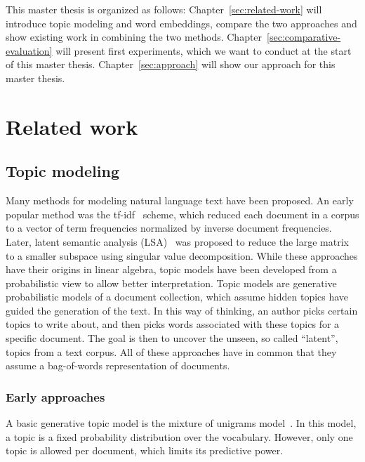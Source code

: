 \documentclass[
        a4paper,
        titlepage,
        twoside,
        parskip
        ]{scrbook}
\theoremstyle{break}
\begin{document}
This master thesis is organized as follows: Chapter~\ref{sec:related-work} will introduce topic modeling and word embeddings, compare the two approaches and show existing work in combining the two methods.
Chapter~\ref{sec:comparative-evaluation} will present first experiments, which we want to conduct at the start of this master thesis.
Chapter~\ref{sec:approach} will show our approach for this master thesis.

\chapter{Related work}
\label{chapter:related-work}
\section{Topic modeling}

Many methods for modeling natural language text have been proposed.
An early popular method was the tf-idf~\cite{SparckJones1972} scheme, which reduced each document in a corpus to a vector of term frequencies normalized by inverse document frequencies.
Later, latent semantic analysis (LSA)~\cite{Deerwester1990} was proposed to reduce the large matrix to a smaller subspace using singular value decomposition.
While these approaches have their origins in linear algebra, topic models have been developed from a probabilistic view to allow better interpretation.
Topic models are generative probabilistic models of a document collection, which assume hidden topics have guided the generation of the text.
In this way of thinking, an author picks certain topics to write about, and then picks words associated with these topics for a specific document.
The goal is then to uncover the unseen, so called ``latent'', topics from a text corpus.
All of these approaches have in common that they assume a bag-of-words representation of documents.

\subsection{Early approaches}
A basic generative topic model is the mixture of unigrams model~\cite{Nigam2000}.
In this model, a topic is a fixed probability distribution over the vocabulary.
However, only one topic is allowed per document, which limits its predictive power.
\end{document}
